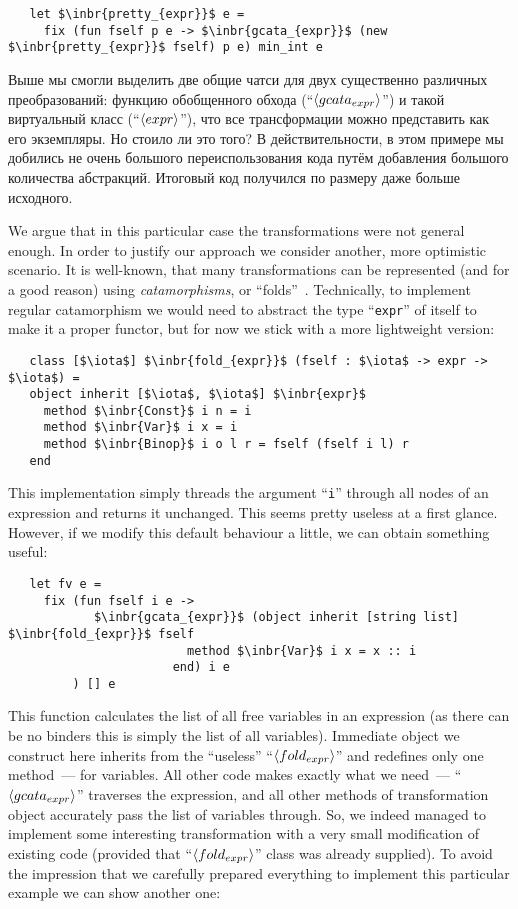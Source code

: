 \begin{lstlisting}
   let $\inbr{pretty_{expr}}$ e =
     fix (fun fself p e -> $\inbr{gcata_{expr}}$ (new $\inbr{pretty_{expr}}$ fself) p e) min_int e
\end{lstlisting}

Выше мы смогли выделить две общие чатси для двух существенно различных преобразований: функцию обобщенного обхода
(``$\left<gcata_{expr}\right>$'') и такой виртуальный класс (``$\left<expr\right>$''), что все трансформации можно представить как его экземпляры.
Но стоило ли это того? В действительности, в этом примере мы добились не очень большого переиспользования кода путём добавления
большого количества абстракций. Итоговый код получился по размеру даже больше исходного.

We argue that in this particular case the transformations were not general enough. In order to justify our approach we consider another, more optimistic scenario. It is
well-known, that many transformations can be represented (and for a good reason) using \emph{catamorphisms}, or ``folds''~\cite{Fold,Bananas,CalculatingFP}. Technically, to
implement regular catamorphism we would need to abstract the type ``\lstinline{expr}'' of itself to make it a proper functor, but for now we stick with a more
lightweight version:

\begin{lstlisting}
   class [$\iota$] $\inbr{fold_{expr}}$ (fself : $\iota$ -> expr -> $\iota$) =
   object inherit [$\iota$, $\iota$] $\inbr{expr}$ 
     method $\inbr{Const}$ i n = i
     method $\inbr{Var}$ i x = i
     method $\inbr{Binop}$ i o l r = fself (fself i l) r
   end
\end{lstlisting}

This implementation simply threads the argument ``\lstinline{i}'' through all nodes of an expression and returns it unchanged. This seems pretty useless at a first
glance. However, if we modify this default behaviour a little, we can obtain something useful:

\begin{lstlisting}
   let fv e =
     fix (fun fself i e ->
            $\inbr{gcata_{expr}}$ (object inherit [string list] $\inbr{fold_{expr}}$ fself
                         method $\inbr{Var}$ i x = x :: i
                       end) i e
         ) [] e
\end{lstlisting}

This function calculates the list of all free variables in an expression (as there can be no binders this is simply the list of all variables). Immediate object we
construct here inherits from the ``useless'' ``$\left<fold_{expr}\right>$'' and redefines only one method~--- for variables. All other code makes exactly what we need~---
``$\left<gcata_{expr}\right>$'' traverses the expression, and all other methods of transformation object accurately pass the list of variables through. So, we indeed
managed to implement some interesting transformation with a very small modification of existing code (provided that ``$\left<fold_{expr}\right>$'' class was already supplied).
To avoid the impression that we carefully prepared everything to implement this particular example we can show another one:

